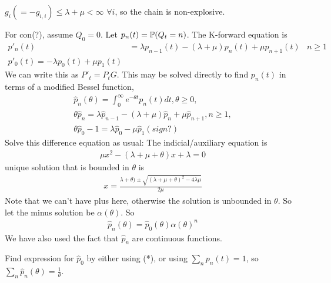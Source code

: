\documentclass[a4paper]{article}
\begin{document}
$g_i ( = -g_{i,i}) \leq \lambda+\mu < \infty$ $\forall i$, so the chain is non-explosive.

For con(?), assume $Q_0 =0 $. Let $p_n(t) =  \P(Q_t = n)$. The K-forward equation is 
\begin{equation*}
\begin{aligned}
p'_n(t) &= \lambda p_{n-1}(t) - (\lambda+\mu)p_n (t) + \mu p_{n+1}(t) & n \geq 1\\
p'_0(t) = -\lambda p_0(t) + \mu p_1(t)
\end{aligned}
\end{equation*}
We can write this as $P'_t = P_t G$. This may be solved directly to find $p_n(t)$ in terms of a modified Bessel function,
\begin{equation*}
\begin{aligned}
\hat{p}_n(\theta) = \int_0^\infty e^{-\theta t} p_n(t) dt, \theta \geq 0,\\
\theta \hat{p}_n = \lambda \hat{p}_{n-1} -(\lambda + \mu) \hat{p}_n + \mu \hat{p}_{n+1}, n \geq 1,\\
\theta \hat{p}_0 - 1 = \lambda \hat{p}_0 - \mu \hat{p}_1 (sign?)
\end{aligned}
\end{equation*}
Solve this difference equation as usual: The indicial/auxiliary equation is
\begin{equation*}
\begin{aligned}
\mu x^2 - (\lambda + \mu + \theta) x + \lambda = 0
\end{aligned}
\end{equation*}
unique solution that is bounded in $\theta$ is
\begin{equation*}
\begin{aligned}
x =\frac{\lambda+\theta) \pm \sqrt{(\lambda+\mu+\theta)^2 -4\lambda \mu}}{2\mu}
\end{aligned}
\end{equation*}
Note that we can't have plus here, otherwise the solution is unbounded in $\theta$. So let the minus solution be $\alpha(\theta)$. So
\begin{equation*}
\begin{aligned}
\hat{p}_n (\theta) = \hat{p}_0(\theta) \alpha(\theta)^n
\end{aligned}
\end{equation*}
We have also used the fact that $\hat{p}_n$ are continuous functions.

Find expression for $\hat{p}_0$ by either using (*), or using $\sum_n p_n(t) = 1$, so $\sum_n \hat{p}_n(\theta) = \frac{1}{\theta}$.
\end{document}
